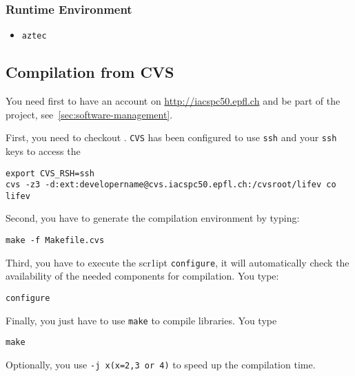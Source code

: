 \subsubsection{Runtime Environment}
\label{sec:runtime-env} 

\begin{itemize}
\item \verb!aztec!
\end{itemize} 

\subsection{Compilation from CVS}
\label{sec:compile-cvs} 
You need first to have an account on \url{http://iacspc50.epfl.ch} and
be part of the \lifev project, see~\ref{sec:software-management}. 

\noindent First, you need to checkout \lifev. \verb!CVS! has
been configured to use \verb!ssh! and your \verb!ssh! keys to
access the 

\begin{verbatim}
export CVS_RSH=ssh
cvs -z3 -d:ext:developername@cvs.iacspc50.epfl.ch:/cvsroot/lifev co lifev
\end{verbatim}

\noindent Second, you have to generate the compilation environment by typing:
\begin{verbatim}
make -f Makefile.cvs
\end{verbatim}

\noindent Third, you have to execute the scr1ipt
\verb!configure!,
it will automatically check the availability of the needed components
for \lifev compilation. You type: 

\begin{verbatim}
configure
\end{verbatim}

\noindent Finally, you just have to use \verb!make! to compile \lifev libraries. You type
\begin{verbatim}
make 
\end{verbatim}
Optionally, you use \verb!-j x(x=2,3 or 4)! to speed up the compilation time.

